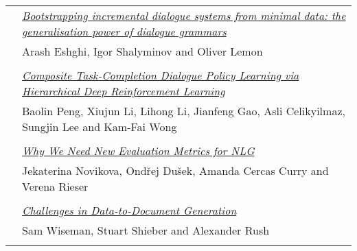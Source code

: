 \begin{tabular}{p{20mm}p{128mm}}
 & \hyperlink{page.2203}{\em Bootstrapping incremental dialogue systems from minimal data: the generalisation power of dialogue grammars}\\
         & Arash Eshghi, Igor Shalyminov and Oliver Lemon \\
\\

 & \hyperlink{page.2214}{\em Composite Task-Completion Dialogue Policy Learning via Hierarchical Deep Reinforcement Learning}\\
         & Baolin Peng, Xiujun Li, Lihong Li, Jianfeng Gao, Asli Celikyilmaz, Sungjin Lee and Kam-Fai Wong \\
\\

 & \hyperlink{page.2224}{\em Why We Need New Evaluation Metrics for NLG}\\
         & Jekaterina Novikova, Ond\v{r}ej Du\v{s}ek, Amanda Cercas Curry and Verena Rieser \\
\\

 & \hyperlink{page.2236}{\em Challenges in Data-to-Document Generation}\\
         & Sam Wiseman, Stuart Shieber and Alexander Rush \\
\\

\end{tabular}
\newpage
